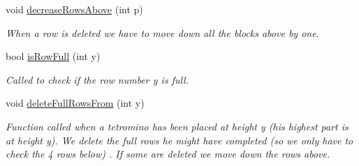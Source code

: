 \begin{DoxyCompactItemize}
void \hyperlink{class_grid_aed150a3b5937bd6bfbfcf914bd30c86c}{decrease\-Rows\-Above} (int p)
\begin{DoxyCompactList}\small\item\em When a row is deleted we have to move down all the blocks above by one. \end{DoxyCompactList}\item 
bool \hyperlink{class_grid_aa053a372e295b34c7bfd44414d31eec6}{is\-Row\-Full} (int y)
\begin{DoxyCompactList}\small\item\em Called to check if the row number y is full. \end{DoxyCompactList}\item 
void \hyperlink{class_grid_a14b06c1a036c2742e6ddc67bc6dbd8cf}{delete\-Full\-Rows\-From} (int y)
\begin{DoxyCompactList}\small\item\em Function called when a tetromino has been placed at height y (his highest part is at height y). We delete the full rows he might have completed (so we only have to check the 4 rows below) . If some are deleted we move down the rows above. \end{DoxyCompactList}\end{DoxyCompactItemize}
